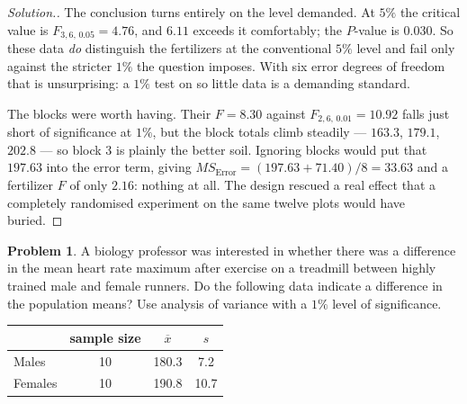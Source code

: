 \documentclass[11pt,a4paper]{article}
\theoremstyle{definition}
\newtheorem{problemx}{Problem}[section]
\newenvironment{problem}{\begin{problemx}}{\end{problemx}}
\newenvironment{solution}
  {\renewcommand{\qedsymbol}{}\begin{proof}[\textit{Solution}.]}
  {\end{proof}}
\begin{document}
\begin{solution}
The conclusion turns entirely on the level demanded. At $5\%$ the critical value is
$F_{3,6,\,0.05}=4.76$, and $6.11$ exceeds it comfortably; the $P$-value is $0.030$. So these
data \emph{do} distinguish the fertilizers at the conventional $5\%$ level and fail only
against the stricter $1\%$ the question imposes. With six error degrees of freedom that is
unsurprising: a $1\%$ test on so little data is a demanding standard.

The blocks were worth having. Their $F=8.30$ against $F_{2,6,\,0.01}=10.92$ falls just short
of significance at $1\%$, but the block totals climb steadily --- $163.3$, $179.1$, $202.8$
--- so block 3 is plainly the better soil. Ignoring blocks would put that $197.63$ into the
error term, giving $MS_{\text{Error}}=(197.63+71.40)/8=33.63$ and a fertilizer $F$ of only
$2.16$: nothing at all. The design rescued a real effect that a completely randomised
experiment on the same twelve plots would have buried.
\end{solution}

\begin{problem}
A biology professor was interested in whether there was a difference in the mean heart rate
maximum after exercise on a treadmill between highly trained male and female runners. Do the
following data indicate a difference in the population means? Use analysis of variance with
a $1\%$ level of significance.
\begin{table}[H]
\centering
\begin{tabular}{l|ccc}
& sample size & $\overline{x}$ & $s$\\
\hline
Males & 10 & 180.3 & 7.2\\
Females & 10 & 190.8 & 10.7\\
\end{tabular}
\end{table}
\end{problem}
\end{document}
